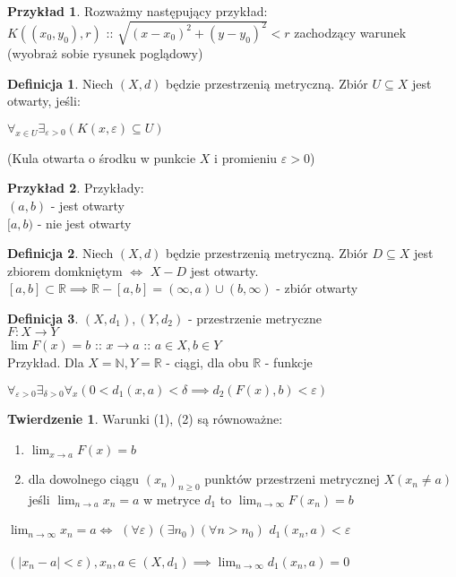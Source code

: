 \documentclass{article}
\theoremstyle{definition}
\newtheorem{de}{Definicja}[subsection]
\theoremstyle{definition}
\newtheorem{tw}{Twierdzenie}[subsection]
\theoremstyle{definition}
\newtheorem{pk}{Przykład}[subsection]
\theoremstyle{definition}
\begin{document}
\begin{pk}
    Rozważmy następujący przykład: \\
    $K((x_0,y_0),r)$ :: 
    $\sqrt{(x-x_0)^2 + (y-y_0)^2} < r$ zachodzący warunek\\
    (wyobraż sobie rysunek poglądowy)
\end{pk}

\begin{de}
    Niech $(X,d)$ będzie przestrzenią metryczną. Zbiór $U\subseteq X$ jest otwarty, jeśli:
    \begin{center}
        $\forall_{x\in U} \exists_{\varepsilon > 0} \left(K(x,\varepsilon) \subseteq U\right)$
    \end{center}
    (Kula otwarta o środku w punkcie $X$ i promieniu $\varepsilon > 0$)
\end{de}

\begin{pk}
    Przykłady: \\
    $(a,b)$ - jest otwarty\\
    $[a,b)$ - nie jest otwarty
\end{pk}

\begin{de}
    Niech $(X,d)$ będzie przestrzenią metryczną. Zbiór $D\subseteq X$ jest zbiorem domkniętym $\iff$ $X - D$ jest otwarty.\\
    $[a,b] \subset \mathbb{R} \implies \mathbb{R} - [a,b] = (\infty, a) \cup (b,\infty)$ - zbiór otwarty
\end{de}

\begin{de}
    $(X,d_1), (Y, d_2)$ - przestrzenie metryczne\\
    $F: X\rightarrow Y$\\
    $\lim F(x) = b$ :: $x\rightarrow a$ :: $a\in X, b\in Y$\\
    Przykład. Dla $X=\mathbb{N}, Y=\mathbb{R}$ - ciągi, dla obu $\mathbb{R}$ - funkcje\\
    \begin{center}
        $\forall_{\varepsilon>0} \exists_{\delta > 0} \forall_{x} (0 < d_1 (x,a) < \delta \implies d_2(F(x),b) < \varepsilon)$
    \end{center}
\end{de}

\begin{tw}
    Warunki (1), (2) są równoważne:
    \begin{enumerate}
        \item $\lim_{x\rightarrow a} F(x) = b$
        \item dla dowolnego ciągu $(x_n)_{n\geq 0}$ 
        punktów przestrzeni metrycznej $X(x_n \neq a)$\\
        jeśli $\lim_{n\rightarrow a} x_n = a$ w metryce $d_1$ to
        $\lim_{n\rightarrow \infty} F(x_n) = b$
    \end{enumerate}
\end{tw}
$\lim_{n\rightarrow \infty} x_n = a \iff$
$(\forall \varepsilon) (\exists n_0) (\forall n>n_0)$  $d_1(x_n,a)< \varepsilon$\\\\
$(|x_n-a|<\varepsilon), x_n, a \in (X, d_1) \implies \lim_{n\rightarrow \infty} d_1(x_n,a) = 0$
\end{document}
